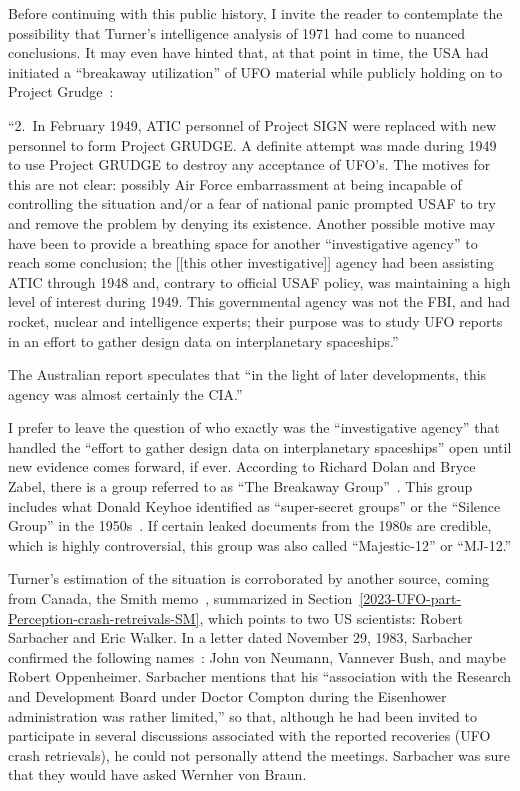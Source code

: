 Before continuing with this public history, I invite the reader to contemplate the possibility that Turner's intelligence analysis of 1971 had come to nuanced conclusions. It may even have hinted that, at that point in time, the USA had initiated a ``breakaway utilization'' of UFO material while publicly holding on to Project Grudge~\cite{TurnerAustralia1971}:
\begin{svgraybox}
``2.~In February 1949, ATIC personnel of Project SIGN were
replaced with new personnel to form Project GRUDGE. A definite
attempt was made during 1949 to use Project GRUDGE to destroy any
acceptance of UFO's. The motives for this are not clear: possibly
Air Force embarrassment at being incapable of controlling the
situation and/or a fear of national panic prompted USAF to try and
remove the problem by denying its existence. Another possible
motive may have been to provide a breathing space for another
``investigative agency'' to reach some conclusion; the [[this other investigative]] agency had been
assisting ATIC through 1948 and, contrary to official USAF policy,
was maintaining a high level of interest during 1949. This governmental
agency was not the FBI, and had rocket, nuclear and intelligence
experts; their purpose was to study UFO reports in an effort to gather
design data on interplanetary spaceships.''
\end{svgraybox}
The Australian report speculates that ``in the light of later developments, this agency was almost certainly the CIA.''

I prefer to leave the question of who exactly was the ``investigative agency'' that handled the ``effort to gather design data on interplanetary spaceships'' open until new evidence comes forward, if ever. According to Richard Dolan and Bryce Zabel, there is a group referred to as ``The Breakaway Group''~\cite{DolanZabel2012May}. This group includes what Donald Keyhoe identified as ``super-secret groups'' or the ``Silence Group'' in the 1950s~\cite[Foreword]{Keyhoe1955}. If certain leaked documents from the 1980s are credible, which is highly controversial, this group was also called ``Majestic-12'' or ``MJ-12.''

Turner's estimation of the situation is corroborated by another source, coming from Canada, the Smith memo~\cite{SmithWilbertMemo},
summarized in Section~\ref{2023-UFO-part-Perception-crash-retreivals-SM}, which points to two US scientists:
Robert Sarbacher and Eric Walker. In a letter dated November 29, 1983, Sarbacher confirmed the following names~\cite{Sarbacher-83}:
John von Neumann, Vannever Bush, and maybe Robert Oppenheimer. Sarbacher mentions that his
``association with the Research and Development Board under Doctor Compton during the Eisenhower administration was rather limited,''
so that, although he had been invited to participate in several discussions associated with the reported recoveries (UFO crash retrievals), he
could not personally attend the meetings. Sarbacher was sure that they would have asked Wernher von Braun.


